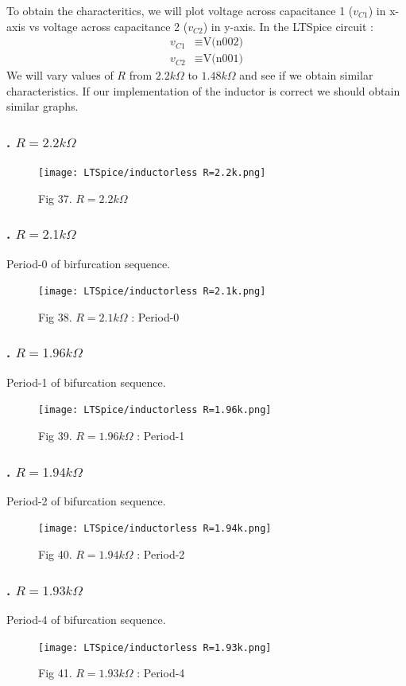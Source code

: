 \documentclass[12pt]{article}
\begin{document}
To obtain the characteritics, we will plot voltage across capacitance 1 ($v_{C1}$) in x-axis vs voltage across capacitance 2 ($v_{C2}$) in y-axis. In the LTSpice circuit :
\begin{align*}
	v_{C1} &\equiv \text{V(n002)} \\
	v_{C2} &\equiv \text{V(n001)}
\end{align*}
We will vary values of $R$ from $2.2k\Omega$ to $1.48k\Omega$ and see if we obtain similar characteristics. \linebreak
If our implementation of the inductor is correct we should obtain similar graphs.
\subsubsection*{. $R=2.2k\Omega$}
\begin{figure}[H] %
	\centering
	\texttt{[image: LTSpice/inductorless R=2.2k.png]}
	\caption{Fig 37. $R=2.2k\Omega$}
\end{figure}
\subsubsection*{. $R=2.1k\Omega$}
Period-0 of birfurcation sequence.
\begin{figure}[H] %
	\centering 
	\texttt{[image: LTSpice/inductorless R=2.1k.png]}
	\caption{Fig 38. $R=2.1k\Omega$ : Period-0}
\end{figure}
\subsubsection*{. $R=1.96k\Omega$}
Period-1 of bifurcation sequence.
\begin{figure}[H] %
	\centering
	\texttt{[image: LTSpice/inductorless R=1.96k.png]}
	\caption{Fig 39. $R=1.96k\Omega$ : Period-1}
\end{figure}
\subsubsection*{. $R=1.94k\Omega$}
Period-2 of bifurcation sequence.
\begin{figure}[H] %
	\centering
	\texttt{[image: LTSpice/inductorless R=1.94k.png]}
	\caption{Fig 40. $R=1.94k\Omega$ : Period-2}
\end{figure}
\subsubsection*{. $R=1.93k\Omega$}
Period-4 of bifurcation sequence.
\begin{figure}[H] %
	\centering
	\texttt{[image: LTSpice/inductorless R=1.93k.png]}
	\caption{Fig 41. $R=1.93k\Omega$ : Period-4}
\end{figure}
\end{document}
